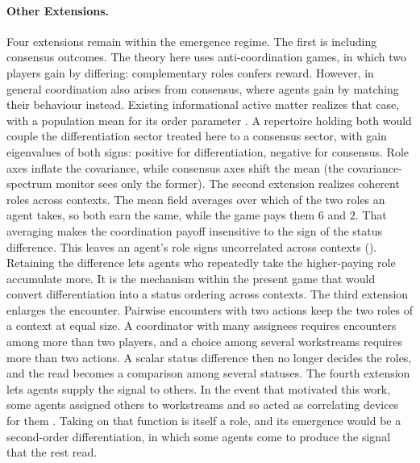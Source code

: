 \documentclass[
  aps,prx,
  reprint,
  superscriptaddress,
  nofootinbib,
  longbibliography
]{revtex4-2}
\newcommand{\smref}[1]{\cite[Sec.~#1]{SM}}
\begin{document}
\paragraph{Other Extensions.} Four extensions remain within the emergence regime. The first is including consensus outcomes. The theory here uses anti-coordination games, in which two players gain by differing: complementary roles confers reward. However, in general coordination also arises from consensus, where agents gain by matching their behaviour instead. Existing informational active matter realizes that case, with a population mean for its order parameter \cite{vansaders2023,ziepke2022}. A repertoire holding both would couple the differentiation sector treated here to a consensus sector, with gain eigenvalues of both signs: positive for differentiation, negative for consensus. Role axes inflate the covariance, while consensus axes shift the mean (the covariance-spectrum monitor sees only the former). The second extension realizes coherent roles across contexts. The mean field averages over which of the two roles an agent takes, so both earn the same, while the game pays them $6$ and $2$. That averaging makes the coordination payoff insensitive to the sign of the status difference. This leaves an agent's role signs uncorrelated across contexts (\smref{S3}). Retaining the difference lets agents who repeatedly take the higher-paying role accumulate more. It is the mechanism within the present game that would convert differentiation into a status ordering across contexts. The third extension enlarges the encounter. Pairwise encounters with two actions keep the two roles of a context at equal size. A coordinator with many assignees requires encounters among more than two players, and a choice among several workstreams requires more than two actions. A scalar status difference then no longer decides the roles, and the read becomes a comparison among several statuses. The fourth extension lets agents supply the signal to others. In the event that motivated this work, some agents assigned others to workstreams and so acted as correlating devices for them \cite{metr2026incident}. Taking on that function is itself a role, and its emergence would be a second-order differentiation, in which some agents come to produce the signal that the rest read.
\end{document}
